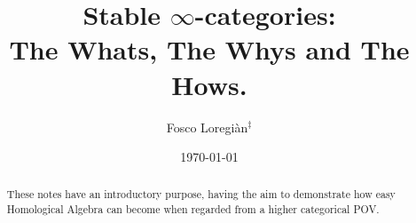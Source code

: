 \documentclass[11pt, a4paper]{amsart}
\begin{document}
\title[Lurification]{Stable $\infty$-categories: \\ The Whats, The Whys and The Hows. }
 
	\author[F. Loregian]{Fosco Loregi\`an${}^\ddag$}
		
\date{\today}

\begin{abstract}
These notes have an introductory purpose, having the aim to demonstrate how easy Homological Algebra can become when regarded from a higher categorical POV.
\end{abstract}

\subjclass[2010]{}
\maketitle 


\end{document}
